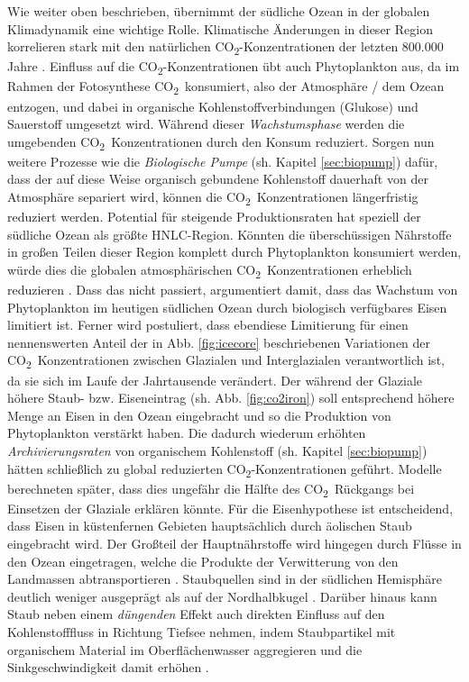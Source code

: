 \documentclass[12pt,a4paper,onecolumn,headheight=30pt]{scrartcl}
\newcommand{\cotwo}{CO\textsubscript{2}}
\begin{document}
Wie weiter oben beschrieben, übernimmt der südliche Ozean in der globalen Klimadynamik eine wichtige Rolle. Klimatische Änderungen in dieser Region korrelieren stark mit den natürlichen \cotwo -Konzentrationen der letzten 800.000 Jahre \citep{Fischer.2010}. Einfluss auf die \cotwo -Konzentrationen übt auch Phytoplankton aus, da im Rahmen der Fotosynthese \cotwo \ konsumiert, also der Atmosphäre / dem Ozean entzogen, und dabei in organische Kohlenstoffverbindungen (Glukose) und Sauerstoff umgesetzt wird. Während dieser \textit{Wachstumsphase} werden die umgebenden \cotwo \ Konzentrationen durch den Konsum reduziert. Sorgen nun weitere Prozesse wie die \textit{Biologische Pumpe} (sh. Kapitel \ref{sec:biopump}) dafür, dass der auf diese Weise organisch gebundene Kohlenstoff dauerhaft von der Atmosphäre separiert wird, können die \cotwo \ Konzentrationen längerfristig reduziert werden. Potential für steigende Produktionsraten hat speziell der südliche Ozean als größte HNLC-Region. Könnten die überschüssigen Nährstoffe in großen Teilen dieser Region komplett durch Phytoplankton konsumiert werden, würde dies die globalen atmosphärischen \cotwo \ Konzentrationen erheblich reduzieren \citep{Martin.1990}. Dass das nicht passiert, argumentiert \citet{Martin.1990} damit, dass das Wachstum von Phytoplankton im heutigen südlichen Ozean durch biologisch verfügbares Eisen limitiert ist. Ferner wird postuliert, dass ebendiese Limitierung für einen nennenswerten Anteil der in Abb. \ref{fig:icecore} beschriebenen Variationen der \cotwo \ Konzentrationen zwischen Glazialen und Interglazialen verantwortlich ist, da sie sich im Laufe der Jahrtausende verändert. Der während der Glaziale höhere Staub- bzw. Eiseneintrag (sh. Abb. \ref{fig:co2iron}) soll entsprechend höhere Menge an Eisen in den Ozean eingebracht und so die Produktion von Phytoplankton verstärkt haben. Die dadurch wiederum erhöhten \textit{Archivierungsraten} von organischem Kohlenstoff (sh. Kapitel \ref{sec:biopump}) hätten schließlich zu global reduzierten \cotwo -Konzentrationen geführt. Modelle berechneten später, dass dies ungefähr die Hälfte des \cotwo \ Rückgangs bei Einsetzen der Glaziale erklären könnte. Für die Eisenhypothese ist entscheidend, dass Eisen in küstenfernen Gebieten  hauptsächlich durch äolischen Staub eingebracht wird. Der Großteil der Hauptnährstoffe wird hingegen durch Flüsse in den Ozean eingetragen, welche die Produkte der Verwitterung von den Landmassen abtransportieren \citep{Emerson.2009}. Staubquellen sind in der südlichen Hemisphäre deutlich weniger ausgeprägt als auf der Nordhalbkugel \citep{Shao.2011}. Darüber hinaus kann Staub neben einem \textit{düngenden} Effekt auch direkten Einfluss auf den Kohlenstofffluss in Richtung Tiefsee nehmen, indem Staubpartikel mit organischem Material im Oberflächenwasser aggregieren und die Sinkgeschwindigkeit damit erhöhen \citep{vanderJagt.2018}.
\end{document}
